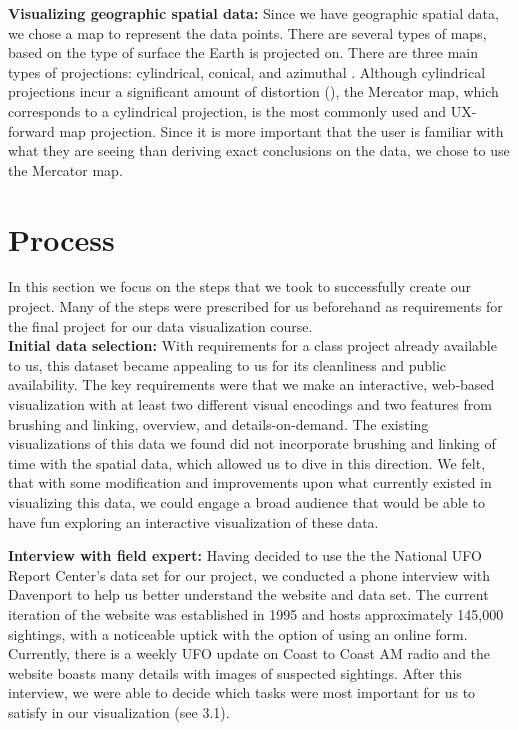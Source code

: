 \documentclass[journal]{vgtc}                %
\begin{document}
\textbf{Visualizing geographic spatial data:}
Since we have geographic spatial data, we chose a map to represent the data points. There are several types of maps, based on the type of surface the Earth is projected on. There are three main types of projections: cylindrical, conical, and azimuthal \cite{projections}. Although cylindrical projections incur a significant amount of distortion (\cite{distortion}), the Mercator map, which corresponds to a cylindrical projection, is the most commonly used and UX-forward map projection. Since it is more important that the user is familiar with what they are seeing than deriving exact conclusions on the data, we chose to use the Mercator map.

\section{Process}
In this section we focus on the steps that we took to successfully create our project. Many of the steps were prescribed for us beforehand as requirements for the final project for our data visualization course. \\

\textbf{Initial data selection:} With requirements for a class project already available to us, this dataset became appealing to us for its cleanliness and public availability. The key requirements were that we make an interactive, web-based visualization with at least two different visual encodings and two features from brushing and linking, overview, and details-on-demand. The existing visualizations of this data we found \cite{dataduo} did not incorporate brushing and linking of time with the spatial data, which allowed us to dive in this direction. We felt, that with some modification and improvements upon what currently existed in visualizing this data, we could engage a broad audience that would be able to have fun exploring an interactive visualization of these data.

\textbf{Interview with field expert:} Having decided to use the the National UFO Report Center's data set for our project, we conducted a phone interview with Davenport to help us better understand the website and data set. The current iteration of the website was established in 1995 and hosts approximately 145,000 sightings, with a noticeable uptick with the option of using an online form. Currently, there is a weekly UFO update on Coast to Coast AM radio and the website boasts many details with images of suspected sightings. After this interview, we were able to decide which tasks were most important for us to satisfy in our visualization (see 3.1).
\end{document}
